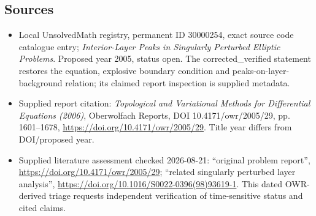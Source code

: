 \documentclass[11pt]{article}
\begin{document}
\subsection{Sources}
\begin{itemize}
\item Local UnsolvedMath registry, permanent ID 30000254, exact source code catalogue entry; \emph{Interior-Layer Peaks in Singularly Perturbed Elliptic Problems}. Proposed year 2005, status open. The corrected\_verified statement restores the equation, explosive boundary condition and peaks-on-layer-background relation; its claimed report inspection is supplied metadata.
\item Supplied report citation: \emph{Topological and Variational Methods for Differential Equations (2006)}, Oberwolfach Reports, DOI 10.4171/owr/2005/29, pp. 1601--1678, \url{https://doi.org/10.4171/owr/2005/29}. Title year differs from DOI/proposed year.
\item Supplied literature assessment checked 2026-08-21: ``original problem report'', \url{https://doi.org/10.4171/owr/2005/29}; ``related singularly perturbed layer analysis'', \url{https://doi.org/10.1016/S0022-0396(98)93619-1}. This dated OWR-derived triage requests independent verification of time-sensitive status and cited claims.
\end{itemize}
\end{document}
